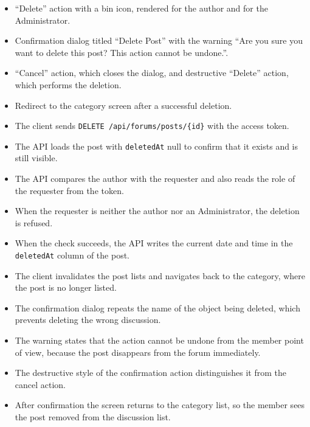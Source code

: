 \begin{itemize}[leftmargin=1.6em,topsep=3pt,itemsep=2pt,parsep=0pt,label=$\bullet$]
      \item ``Delete'' action with a bin icon, rendered for the author and for the Administrator.
      \item Confirmation dialog titled ``Delete Post'' with the warning ``Are you sure you
            want to delete this post? This action cannot be undone.''.
      \item ``Cancel'' action, which closes the dialog, and destructive ``Delete'' action, which
            performs the deletion.
      \item Redirect to the category screen after a successful deletion.
\end{itemize}

\begin{itemize}[leftmargin=1.6em,topsep=3pt,itemsep=2pt,parsep=0pt,label=$\bullet$]
      \item The client sends \texttt{DELETE /api/forums/posts/\{id\}} with the access
            token.
      \item The API loads the post with \texttt{deletedAt} null to confirm that it exists
            and is still visible.
      \item The API compares the author with the requester and also reads the role of the
            requester from the token.
      \item When the requester is neither the author nor an Administrator, the deletion is
            refused.
      \item When the check succeeds, the API writes the current date and time in the
            \texttt{deletedAt} column of the post.
      \item The client invalidates the post lists and navigates back to the category, where
            the post is no longer listed.
\end{itemize}

\begin{itemize}[leftmargin=1.6em,topsep=3pt,itemsep=2pt,parsep=0pt,label=$\bullet$]
      \item The confirmation dialog repeats the name of the object being deleted, which
            prevents deleting the wrong discussion.
      \item The warning states that the action cannot be undone from the member point of
            view, because the post disappears from the forum immediately.
      \item The destructive style of the confirmation action distinguishes it from the
            cancel action.
      \item After confirmation the screen returns to the category list, so the member sees
            the post removed from the discussion list.
\end{itemize}

